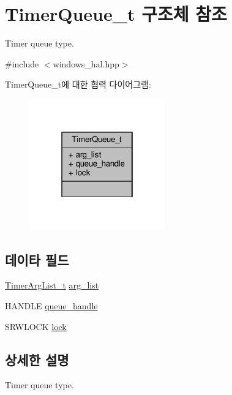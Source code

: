 \hypertarget{struct_timer_queue__t}{}\section{Timer\+Queue\+\_\+t 구조체 참조}
\label{struct_timer_queue__t}


Timer queue type.  




{\ttfamily \#include $<$windows\+\_\+hal.\+hpp$>$}



Timer\+Queue\+\_\+t에 대한 협력 다이어그램\+:
\nopagebreak
\begin{figure}[H]
\begin{center}
\leavevmode
\includegraphics[width=166pt]{struct_timer_queue__t__coll__graph}
\end{center}
\end{figure}
\subsection*{데이타 필드}
\begin{DoxyCompactItemize}
\item 
\hyperlink{windows__hal_8hpp_a52f8033c0b50f46374156ec8180abde4}{Timer\+Arg\+List\+\_\+t} \hyperlink{struct_timer_queue__t_abdc40944ec73781857b64230be2052df}{arg\+\_\+list}
\item 
H\+A\+N\+D\+LE \hyperlink{struct_timer_queue__t_a0891fe4ac1705d165bbd1511a826cb6a}{queue\+\_\+handle}
\item 
S\+R\+W\+L\+O\+CK \hyperlink{struct_timer_queue__t_afed18a2dbad108768defb51810a7a760}{lock}
\end{DoxyCompactItemize}


\subsection{상세한 설명}
Timer queue type. 


